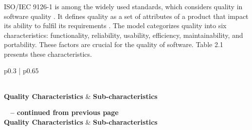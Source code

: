 ISO/IEC 9126-1 is among the widely used standards, which considers quality in software quality \cite{losavio2004iso}. It defines quality as a set of attributes of a product that impact its ability to fulfil its requirements \cite{losavio2004iso}. The model categorizes quality into six characteristics: functionality, reliability, usability, efficiency, maintainability, and portability. These factors are crucial for the quality of software. Table 2.1 presents these characteristics.


\begin{longtable}{p{} | p{}}
    \caption{Sub-characteristics of the ISO 9126-1 quality model \cite{losavio2004iso}} \label{tab:table1} \\
    \textbf{Quality Characteristics} & \textbf{Sub-characteristics} \\
    \hline
    \endfirsthead

    {{\bfseries \tablename\ \thetable{} -- continued from previous page}} \\
    \textbf{Quality Characteristics} & \textbf{Sub-characteristics} \\
    \hline
    \endhead

    \hline {} \\
    \endfoot


\end{longtable}
